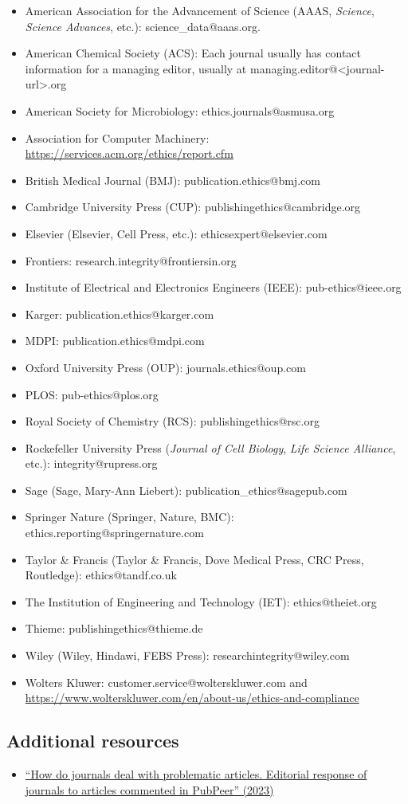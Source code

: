 \documentclass[letterpaper, 12pt]{article}
\begin{document}
\begin{itemize}
    \setlength\itemsep{-0.5em}
    \item American Association for the Advancement of Science (AAAS, \textit{Science}, \textit{Science Advances}, etc.):  science\_data@aaas.org.
    \item American Chemical Society (ACS): Each journal usually has contact information for a managing editor, usually at managing.editor@<journal-url>.org
    \item American Society for Microbiology: ethics.journals@asmusa.org
    \item Association for Computer Machinery: \url{https://services.acm.org/ethics/report.cfm}
    \item British Medical Journal (BMJ): publication.ethics@bmj.com
    \item Cambridge University Press (CUP): publishingethics@cambridge.org
    \item Elsevier (Elsevier, Cell Press, etc.): ethicsexpert@elsevier.com
    \item Frontiers: research.integrity@frontiersin.org
    \item Institute of Electrical and Electronics Engineers (IEEE): pub-ethics@ieee.org
    \item Karger: publication.ethics@karger.com
    \item MDPI: publication.ethics@mdpi.com
    \item Oxford University Press (OUP): journals.ethics@oup.com
    \item PLOS: pub-ethics@plos.org
    \item Royal Society of Chemistry (RCS): publishingethics@rsc.org
    \item Rockefeller University Press (\textit{Journal of Cell Biology}, \textit{Life Science Alliance}, etc.): integrity@rupress.org
    \item Sage (Sage, Mary-Ann Liebert): publication\_ethics@sagepub.com
    \item Springer Nature (Springer, Nature, BMC): ethics.reporting@springernature.com
    \item Taylor \& Francis (Taylor \& Francis, Dove Medical Press, CRC Press, Routledge): ethics@tandf.co.uk
    \item The Institution of Engineering and Technology (IET): ethics@theiet.org
    \item Thieme: publishingethics@thieme.de
    \item Wiley (Wiley, Hindawi, FEBS Press): researchintegrity@wiley.com
    \item Wolters Kluwer: customer.service@wolterskluwer.com and \url{https://www.wolterskluwer.com/en/about-us/ethics-and-compliance}
\end{itemize}

\subsection*{Additional resources}

\begin{itemize}
    \setlength\itemsep{-0.5em}
    \item \href{https://doi.org/10.3145/epi.2023.ene.18}{``How do journals deal with problematic articles. Editorial response of journals to articles commented in PubPeer'' (2023)}
\end{itemize}
\end{document}
